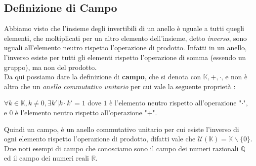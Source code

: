 \documentclass[12pt, letterpaper]{article}
\begin{document}
\subsection{Definizione di Campo}
Abbiamo visto che l'insieme degli invertibili di un anello è uguale a tutti quegli elementi, che moltiplicati per 
un altro elemento dell'insieme, detto \textit{inverso}, sono uguali all'elemento neutro rispetto l'operazione di prodotto.
Infatti in un anello, l'inverso esiste per tutti gli elementi rispetto l'operazione di somma (essendo un 
gruppo), ma non del prodotto. \\Da qui possiamo dare la definizione di \textbf{campo}, che si denota con
\(\mathbb{K},+,\cdot\), e non è altro che un \textit{anello commutativo unitario} per cui vale la seguente proprietà :
\begin{center}
    \(
        \forall k\in\mathbb{K} ,k\ne0, \exists k' | k\cdot k' = 1  \) dove \(1\) è l'elemento neutro rispetto all'operazione "\(\cdot\)", e 
        \(0\) è l'elemento neutro rispetto all'operazione "\(+\)".
\end{center}
Quindi un campo, è un anello commutativo unitario per cui esiste l'inverso di ogni elemento rispetto l'operazione di prodotto, difatti 
vale che \(\mathcal{U}(\mathbb{K})=\mathbb{K}\backslash \{0\}\). Due noti esempi di campo che conosciamo sono il campo 
dei numeri razionali \(\mathbb{Q}\) ed il campo dei numeri reali \(\mathbb{R}\).
\end{document}
